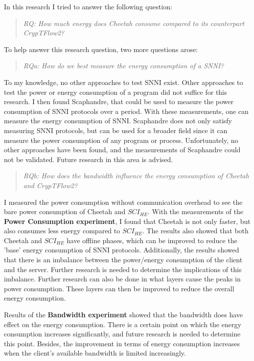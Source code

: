 \documentclass[../thesis.tex]{subfiles}
\begin{document}
In this research I tried to answer the following question:

\begin{quote} \emph{RQ: How much energy does Cheetah consume compared to its counterpart CrypTFlow2?} \end{quote} 

To help answer this research question, two more questions arose:

\begin{quote} \emph{RQa: How do we best measure the energy consumption of a SNNI?} \end{quote}

To my knowledge, no other approaches to test SNNI exist. Other approaches to test the power or energy consumption of a program did not suffice for this research. I then found Scaphandre, that could be used to measure the power consumption of SNNI protocols over a period. With these measurements, one can measure the energy consumption of SNNI. Scaphandre does not only satisfy measuring SNNI protocols, but can be used for a broader field since it can measure the power consumption of any program or process. Unfortunately, no other approaches have been found, and the measurements of Scaphandre could not be validated. Future research in this area is advised.

\begin{quote} \emph{RQb: How does the bandwidth influence the energy consumption of Cheetah and CrypTFlow2?} \end{quote}

I measured the power consumption without communication overhead to see the bare power consumption of Cheetah and $SCI_{HE}$. With the measurements of the \textbf{Power Consumption experiment}, I found that Cheetah is not only faster, but also consumes less energy compared to $SCI_{HE}$. The results also showed that both Cheetah and $SCI_{HE}$ have offline phases, which can be improved to reduce the 'base' energy consumption of SNNI protocols. Additionally, the results showed that there is an imbalance between the power/energy consumption of the client and the server. Further research is needed to determine the implications of this imbalance. Further research can also be done in what layers cause the peaks in power consumption. These layers can then be improved to reduce the overall energy consumption. 

Results of the \textbf{Bandwidth experiment} showed that the bandwidth does have effect on the energy consumption. There is a certain point on which the energy consumption increases significantly, and future research is needed to determine this point. Besides, the improvement in terms of energy consumption increases when the client's available bandwidth is limited increasingly. 
\end{document}
